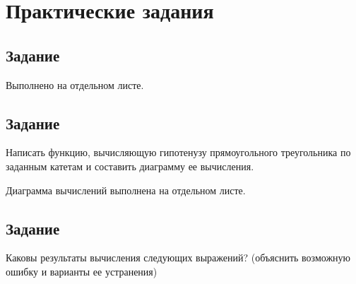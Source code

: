 \section{Практические задания}

\subsection{Задание }

Выполнено на отдельном листе.

\subsection{Задание }

Написать функцию, вычисляющую гипотенузу прямоугольного треугольника по заданным катетам и составить диаграмму ее вычисления.


Диаграмма вычислений выполнена на отдельном листе.


\subsection{Задание }

Каковы результаты вычисления следующих выражений? (объяснить возможную ошибку и варианты ее устранения)

